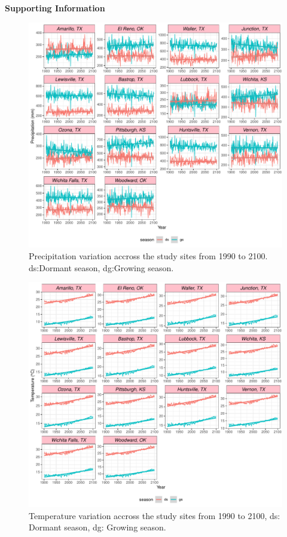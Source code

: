 \documentclass[12pt]{article}
\begin{document}
\centerline{\Large{\textbf{Supporting Information}}}


\begin{figure}[H]
		\centering
		\includegraphics[width=0.95\linewidth]{Figures/fig_pr_past_present_future.pdf}
		\caption{Precipitation variation accross the study sites from 1990 to 2100.
		ds:Dormant season, dg:Growing season.}
		\label{Sup:pr_variation}
\end{figure}


\begin{figure}[H]
		\centering
		\includegraphics[width=0.95\linewidth]{Figures/fig_tas_past_present_future.pdf}
		\caption{Temperature variation accross the study sites from 1990 to 2100,
		ds: Dormant season, dg: Growing season.}
		\label{Sup:temp_variation}
\end{figure}
\end{document}
